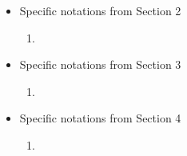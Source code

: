 \begin{itemize}
\begin{enumerate}
		\item \(\Prob\), \(\E\) -- probability and expectation. Write \(\E_{\Phi}\) to indicate the source of randomness.
	\end{enumerate} 
	\item Specific notations from Section 2
	\begin{enumerate}
		\item
	\end{enumerate}
	\item Specific notations from Section 3
	\begin{enumerate}
		\item
	\end{enumerate}
	\item Specific notations from Section 4
	\begin{enumerate}
		\item
	\end{enumerate}
\end{itemize}

